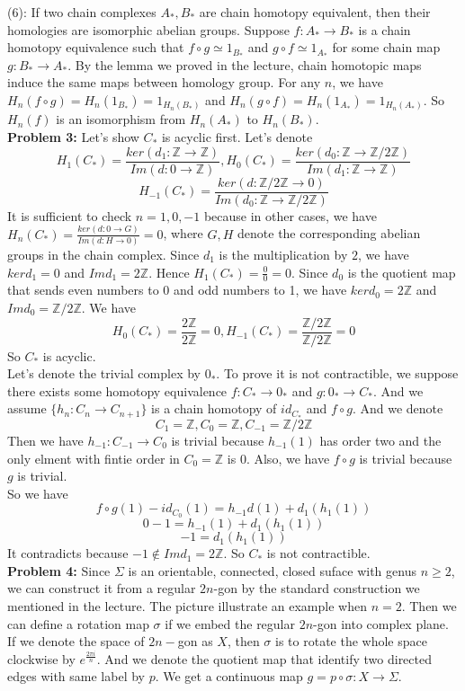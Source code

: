 \documentclass[12pt]{amsart}
\newcommand{\Z}{\mathbb{Z}}
\begin{document}
(6): If two chain complexes $A_\ast,B_\ast$ are chain homotopy equivalent, then their homologies are isomorphic abelian groups. Suppose $f:A_\ast\to B_\ast$ is a chain homotopy equivalence such that $f\circ g\simeq 1_{B_\ast}$ and $g\circ f\simeq 1_{A_\ast}$ for some chain map $g:B_\ast\to A_\ast$. By the lemma we proved in the lecture, chain homotopic maps induce the same maps between homology group. For any $n$, we have $H_n(f\circ g)=H_n(1_{B_\ast})=1_{H_n(B_\ast)}$ and $H_n(g\circ f)=H_n(1_{A_\ast})=1_{H_n(A_\ast)}$. So $H_n(f)$ is an isomorphism from $H_n(A_\ast)$ to $H_n(B_\ast)$. 
\pagebreak\\
\textbf{Problem 3:} Let's show $C_\ast$ is acyclic first. Let's denote 
\[H_1(C_\ast)=\frac{ker(d_1:\Z\to \Z)}{Im(d:0\to \Z)}, H_0(C_\ast)=\frac{ker(d_0:\Z\to \Z/2\Z)}{Im(d_1:\Z\to\Z)}\]
\[H_{-1}(C_\ast)=\frac{ker(d:\Z/2\Z\to 0)}{Im(d_0:\Z\to \Z/2\Z)}\]
It is sufficient to check $n=1,0,-1$ because in other cases, we have $H_n(C_\ast)=\frac{ker(d:0\to G)}{Im(d:H\to 0)}=0$, where $G,H$ denote the corresponding abelian groups in the chain complex.
Since $d_1$ is the multiplication by $2$, we have $kerd_1=0$ and $Imd_1=2\Z$. Hence $H_1(C_\ast)=\frac{0}{0}=0$. Since $d_0$ is the quotient map that sends even numbers to 0 and odd numbers to 1, we have $kerd_0=2\Z$ and $Imd_0=\Z/2\Z$. We have 
\[H_0(C_\ast)=\frac{2\Z}{2\Z}=0,H_{-1}(C_\ast)=\frac{\Z/2\Z}{\Z/2\Z}=0\]
So $C_\ast$ is acyclic.\\
Let's denote the trivial complex by $0_\ast$. To prove it is not contractible, we suppose there exists some homotopy equivalence $f:C_\ast\to 0_\ast$ and $g:0_\ast\to C_\ast$. And we assume $\{h_n:C_n\to C_{n+1}\}$ is a chain homotopy of $id_{C_\ast}$ and $f\circ g$. And we denote 
\[C_1=\Z,C_0=\Z,C_{-1}=\Z/2\Z\]
Then we have $h_{-1}:C_{-1}\to C_0$ is trivial because $h_{-1}(1)$ has order two and the only elment with fintie order in $C_0=\Z$ is $0$. Also, we have $f\circ g$ is trivial because $g$ is trivial.\\
So we have 
\[f\circ g(1)-id_{C_0}(1)=h_{-1}d(1)+d_1(h_{1}(1))\]
\[0-1=h_{-1}(1)+d_1(h_1(1))\]
\[-1=d_1(h_1(1))\]
It contradicts because $-1\notin Imd_1=2\Z$. So $C_\ast$ is not contractible.\\
\textbf{Problem 4:} Since $\Sigma$ is an orientable, connected, closed suface with genus $n\geq 2$, we can construct it from a regular $2n$-gon by the standard construction we mentioned in the lecture. 
The picture illustrate an example when $n=2$. Then we can define a rotation map $\sigma$ if we embed the regular $2n$-gon into complex plane. If we denote the space of $2n-$gon as $X$, then $\sigma$ is to rotate the whole space clockwise by $e^{\frac{2\pi i}{n}}$. And we denote the quotient map that identify two directed edges with same label by $p$. We get a continuous map $g=p\circ \sigma:X\to\Sigma$.\\
\end{document}
